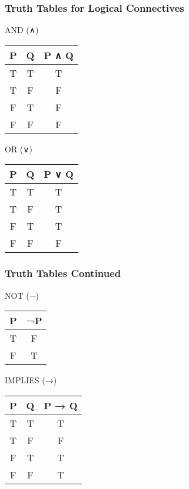 \documentclass[aspectratio=169]{beamer}
\begin{document}
\begin{frame}[fragile]
    \frametitle{Truth Tables for Logical Connectives}
    \begin{block}{AND (∧)}
        \begin{tabular}{|c|c|c|}
            \hline
            P & Q & P ∧ Q \\
            \hline
            T & T & T \\
            T & F & F \\
            F & T & F \\
            F & F & F \\
            \hline
        \end{tabular}
    \end{block}

    \begin{block}{OR (∨)}
        \begin{tabular}{|c|c|c|}
            \hline
            P & Q & P ∨ Q \\
            \hline
            T & T & T \\
            T & F & T \\
            F & T & T \\
            F & F & F \\
            \hline
        \end{tabular}
    \end{block}
\end{frame}

\begin{frame}[fragile]
    \frametitle{Truth Tables Continued}
    \begin{block}{NOT (¬)}
        \begin{tabular}{|c|c|}
            \hline
            P & ¬P \\
            \hline
            T & F \\
            F & T \\
            \hline
        \end{tabular}
    \end{block}

    \begin{block}{IMPLIES (→)}
        \begin{tabular}{|c|c|c|}
            \hline
            P & Q & P → Q \\
            \hline
            T & T & T \\
            T & F & F \\
            F & T & T \\
            F & F & T \\
            \hline
        \end{tabular}
    \end{block}
\end{frame}
\end{document}
